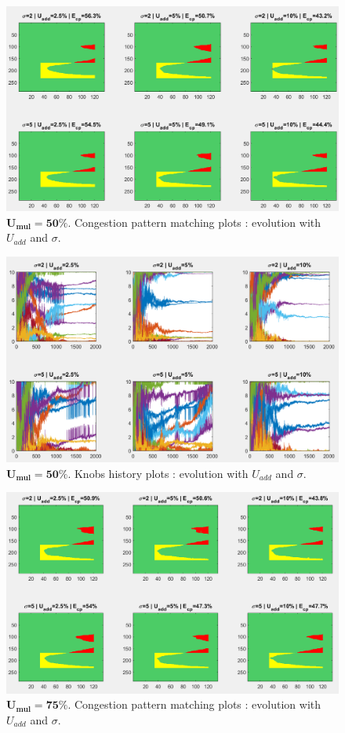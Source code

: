 \begin{figure}
	\label{fig:umulcp50}
	\caption{$\mathbf{U_{mul}=50\%}$. Congestion pattern matching plots : evolution with $U_{add}$ and $\sigma$.}
	\includegraphics[width=7in]{figures/results_figures/Umul/cp_Umul_50_lambda_11.png}
\end{figure}
\begin{figure}
	\label{fig:umulknobs50}
	\caption{$\mathbf{U_{mul}=50\%}$. Knobs history plots : evolution with $U_{add}$ and $\sigma$.}
	\includegraphics[width=7in]{figures/results_figures/Umul/knobs_Umul_50_lambda_11.png}
\end{figure}	
\begin{figure}
	\label{fig:umulcp75}
	\caption{$\mathbf{U_{mul}=75\%}$. Congestion pattern matching plots : evolution with $U_{add}$ and $\sigma$.}
	\includegraphics[width=7in]{figures/results_figures/Umul/cp_Umul_75_lambda_11.png}
\end{figure}
